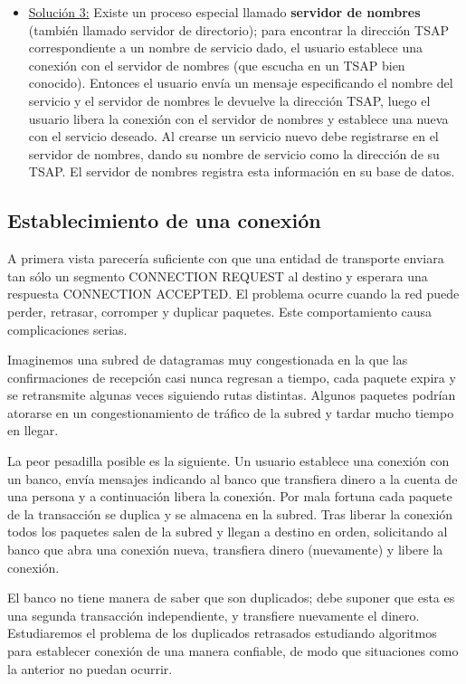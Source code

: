 \documentclass[10pt,a4paper]{report}
\begin{document}
\begin{itemize}
	\item  \underline{Solución 3:} Existe un proceso especial llamado \textbf{servidor 
	de nombres} (también llamado servidor de directorio); para encontrar la dirección 
	TSAP correspondiente a un nombre de servicio dado, el usuario establece una 
	conexión con el servidor de nombres (que escucha en un TSAP bien conocido). 
	Entonces el 	usuario envía un mensaje especificando el nombre del servicio y el 
	servidor de nombres le devuelve la dirección TSAP, luego el usuario libera la 
	conexión con el servidor de nombres y establece una nueva con el servicio deseado. 
	Al crearse un servicio nuevo debe registrarse en el servidor de nombres, dando su 
	nombre de servicio como la dirección de su TSAP. El servidor de nombres registra 
	esta 	información en su base de datos.
\end{itemize} 

\subsection{Establecimiento de una conexión}

	\par A primera vista parecería suficiente con que una entidad de transporte enviara tan 
sólo un segmento CONNECTION REQUEST al destino y esperara una respuesta CONNECTION ACCEPTED. El problema ocurre cuando la red puede perder, retrasar, corromper y duplicar paquetes. Este comportamiento causa complicaciones serias.

	\par Imaginemos una subred de datagramas muy congestionada en la que las confirmaciones de recepción casi nunca regresan a tiempo, cada paquete expira y se retransmite algunas veces siguiendo rutas distintas. Algunos paquetes podrían atorarse en un congestionamiento de tráfico de la subred y tardar mucho tiempo en llegar.

	\par La peor pesadilla posible es la siguiente. Un usuario establece una conexión con un banco, envía mensajes indicando al banco que transfiera dinero a la cuenta de una persona y a continuación libera la conexión. Por mala fortuna cada paquete de la transacción se duplica y se almacena en la subred. Tras liberar la conexión todos los paquetes salen de la subred y llegan a destino en orden, solicitando al banco que abra una conexión nueva, transfiera dinero (nuevamente) y libere la conexión.

	\par El banco no tiene manera de saber que son duplicados; debe suponer que esta es una segunda transacción independiente, y transfiere nuevamente el dinero. Estudiaremos el problema de los duplicados retrasados estudiando algoritmos para establecer conexión de una manera confiable, de modo que situaciones como la anterior no puedan ocurrir.
\end{document}
